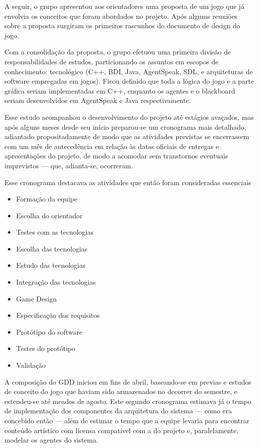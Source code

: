 A seguir, o grupo apresentou aos orientadores uma proposta de um jogo que já envolvia os conceitos que foram abordados no projeto. Após algums reuniões sobre a proposta surgiram os primeiros rascunhos do documento de design do jogo.

Com a consolidação da proposta, o grupo efetuou uma primeira divisão de responsabilidades de estudos, particionando os assuntos em escopos de conhecimento: tecnológico (C++, BDI, Java, AgentSpeak, SDL, e arquiteturas de software empregadas em jogos).
Ficou definido que toda a lógica do jogo e a parte gráfica seriam implementadas em C++, enquanto os agentes e o blackboard seriam desenvolvidos em AgentSpeak e Java respectivamente.

Esse estudo acompanhou o desenvolvimento do projeto até estágios avaçados, mas após alguns meses desde seu início preparou-se um cronograma mais detalhado, adiantado propositadamente de modo que as atividades previstas se encerrassem com um mês de antecedência em relação às datas oficiais de entregas e apresentações do projeto, de modo a acomodar sem transtornos eventuais imprevistos --- que, adianta-se, ocorreram.

Esse cronograma destacava as atividades que então foram consideradas essenciais
\begin{itemize}
\item Formação da equipe
\item Escolha do orientador
\item Testes com as tecnologias
\item Escolha das tecnologias
\item Estudo das tecnologias
\item Integração das tecnologias
\item Game Design
\item Especificação dos requisitos
\item Protótipo do software
\item Testes do protótipo
\item Validação
\end{itemize}

A composição do GDD iniciou em fins de abril, baseando-se em previas e estudos de conceito do jogo que haviam sido armazenados no decorrer do semestre, e estendeu-se até meados de agosto. Este segundo cronograma estimava já o tempo de implementação dos componentes da arquitetura do sistema --- como era concebido então --- além de estimar o tempo que a equipe levaria para encontrar conteúdo artístico com licensa compatível com a do projeto e, paralelamente, modelar os agentes do sistema.


